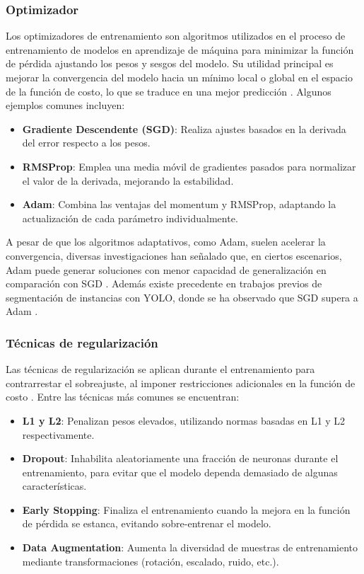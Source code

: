 \subsubsection{Optimizador}
Los optimizadores de entrenamiento son algoritmos utilizados en el proceso de entrenamiento de modelos en aprendizaje de máquina para minimizar la función de pérdida ajustando los pesos y sesgos del modelo. Su utilidad principal es mejorar la convergencia del modelo hacia un mínimo local o global en el espacio de la función de costo, lo que se traduce en una mejor predicción \cite{Goodfellow-et-al-2016}. Algunos ejemplos comunes incluyen:

\begin{itemize}
\setlength\itemsep{-0.3em}
    \item \textbf{Gradiente Descendente (SGD)}: Realiza ajustes basados en la derivada del error respecto a los pesos.
    \item \textbf{RMSProp}: Emplea una media móvil de gradientes pasados para normalizar el valor de la derivada, mejorando la estabilidad.
    \item \textbf{Adam}: Combina las ventajas del momentum y RMSProp, adaptando la actualización de cada parámetro individualmente.
\end{itemize}

A pesar de que los algoritmos adaptativos, como Adam, suelen acelerar la convergencia, diversas investigaciones han señalado que, en ciertos escenarios, Adam puede generar soluciones con menor capacidad de generalización en comparación con SGD \cite{Keskar2017, Deng2009, Goyal2017, He2016}. Además existe precedente en trabajos previos de segmentación de instancias con YOLO, donde se ha observado que SGD supera a Adam \cite{Guerrero2024, Lopez2024}.

\subsubsection{Técnicas de regularización}
Las técnicas de regularización se aplican durante el entrenamiento para contrarrestar el sobreajuste, al imponer restricciones adicionales en la función de costo \cite{Goodfellow-et-al-2016}. Entre las técnicas más comunes se encuentran:
 
\begin{itemize}
\setlength\itemsep{-0.3em}
    \item \textbf{L1 y L2}: Penalizan pesos elevados, utilizando normas basadas en L1 y L2 respectivamente.
    \item \textbf{Dropout}: Inhabilita aleatoriamente una fracción de neuronas durante el entrenamiento, para evitar que el modelo dependa demasiado de algunas características.
    \item \textbf{Early Stopping}: Finaliza el entrenamiento cuando la mejora en la función de pérdida se estanca, evitando sobre-entrenar el modelo.
    \item \textbf{Data Augmentation}: Aumenta la diversidad de muestras de entrenamiento mediante transformaciones (rotación, escalado, ruido, etc.).
\end{itemize}

